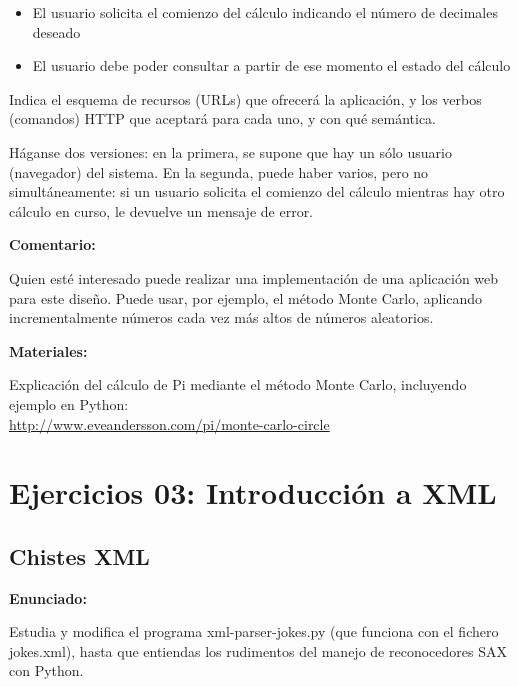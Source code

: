 \begin{itemize}
\item El usuario solicita el comienzo del cálculo indicando el número de decimales deseado
\item El usuario debe poder consultar a partir de ese momento el estado del cálculo
\end{itemize}

Indica el esquema de recursos (URLs) que ofrecerá la aplicación, y los verbos (comandos) HTTP que aceptará para cada uno, y con qué semántica.

Háganse dos versiones: en la primera, se supone que hay un sólo usuario (navegador) del sistema. En la segunda, puede haber varios, pero no simultáneamente: si un usuario solicita el comienzo del cálculo mientras hay otro cálculo en curso, le devuelve un mensaje de error.

\textbf{Comentario:}

Quien esté interesado puede realizar una implementación de una aplicación web para este diseño. Puede usar, por ejemplo, el método Monte Carlo, aplicando incrementalmente números cada vez más altos de números aleatorios.

\textbf{Materiales:}

Explicación del cálculo de Pi mediante el método Monte Carlo, incluyendo ejemplo en Python: \\
\url{http://www.eveandersson.com/pi/monte-carlo-circle}


\section{Ejercicios 03: Introducción a XML}


\subsection{Chistes XML}
\label{subsec:xml-chistes}

\textbf{Enunciado:}

Estudia y modifica el programa xml-parser-jokes.py (que funciona con el fichero jokes.xml), hasta que entiendas los rudimentos del manejo de reconocedores SAX con Python.

